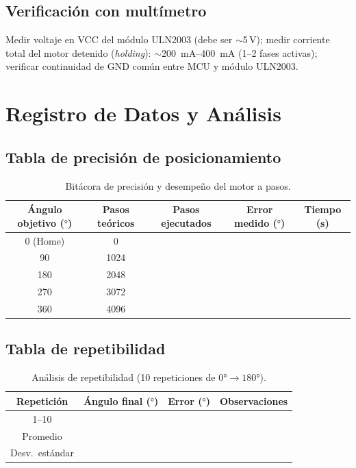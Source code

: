 \documentclass[11pt]{article}
\begin{document}
\subsection{Verificación con multímetro}
Medir voltaje en VCC del módulo ULN2003 (debe ser $\sim$5\,V); medir corriente total del
motor detenido (\emph{holding}): $\sim$\SIrange{200}{400}{\milli\ampere} (1--2 fases
activas); verificar continuidad de GND común entre MCU y módulo ULN2003.

\section{Registro de Datos y Análisis}

\subsection{Tabla de precisión de posicionamiento}
\begin{table}[H]\centering
\caption{Bitácora de precisión y desempeño del motor a pasos.}
\begin{tabular}{ccccc}
\toprule
Ángulo objetivo ($\si{\degree}$) & Pasos teóricos & Pasos ejecutados & Error medido ($\si{\degree}$) & Tiempo (s) \\
\midrule
0 (Home) & 0 & & & \\
90 & 1024 & & & \\
180 & 2048 & & & \\
270 & 3072 & & & \\
360 & 4096 & & & \\
\bottomrule
\end{tabular}
\end{table}

\subsection{Tabla de repetibilidad}
\begin{table}[H]\centering
\caption{Análisis de repetibilidad (10 repeticiones de $0\si{\degree}\to 180\si{\degree}$).}
\begin{tabular}{cccc}
\toprule
Repetición & Ángulo final ($\si{\degree}$) & Error ($\si{\degree}$) & Observaciones \\
\midrule
1--10 & & & \\
\midrule
Promedio & & & \\
Desv.\ estándar & & & \\
\bottomrule
\end{tabular}
\end{table}
\end{document}
